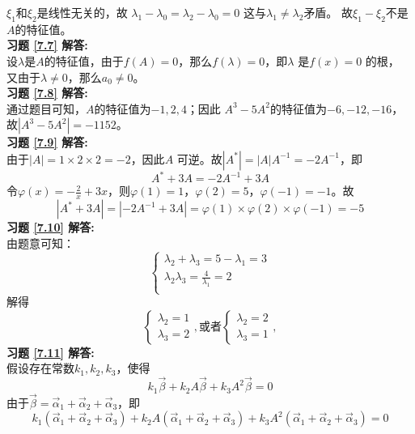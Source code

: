 \documentclass[a4paper]{book}
\begin{document}
$\xi_1$和$\xi_2$是线性无关的，故
$\lambda_1-\lambda_0=\lambda_2-\lambda_0=0$
这与$\lambda_1\neq\lambda_2$矛盾。
故$\xi_1-\xi_2$不是$A$的特征值。\\
\textbf{习题 \ref{7.7} 解答:}\\
设$\lambda$是$A$的特征值，由于$f(A)=0$，那么$f(\lambda)=0$，即$\lambda$ 是$f(x)=0$ 的根，
 又由于$\lambda\neq0$，那么$a_0\neq0$。\\
\textbf{习题 \ref{7.8} 解答:}\\
通过题目可知，$A$的特征值为$-1,2,4$；因此
$A^3-5A^2$的特征值为$-6,-12,-16$，故$|A^3-5A^2|=-1152$。\\
\textbf{习题 \ref{7.9} 解答:}\\
由于$|A|=1\times2\times2=-2$，因此$A$ 可逆。故$|A^*|=|A|A^{-1}=-2A^{-1}$，即
\begin{equation*}
  A^*+3A=-2A^{-1}+3A
\end{equation*}
令$\varphi(x)=-\frac{2}{x}+3x$，则$\varphi(1)=1$，$\varphi(2)=5$，$\varphi(-1)=-1$。故
\begin{equation*}
  |A^*+3A|=|-2A^{-1}+3A|=\varphi(1)\times\varphi(2)\times\varphi(-1)=-5
\end{equation*}
\textbf{习题 \ref{7.10} 解答:}\\
由题意可知：
\begin{equation*}
  \begin{cases}
  \lambda_2+\lambda_3=5-\lambda_1=3\\
  \lambda_2\lambda_3=\frac{4}{\lambda_1}=2\\
  \end{cases}
\end{equation*}
解得
\begin{equation*}
  \begin{cases}
  \lambda_2=1\\
  \lambda_3=2
  \end{cases},
  \text{或者}
    \begin{cases}
  \lambda_2=2\\
  \lambda_3=1
  \end{cases},
\end{equation*}
\textbf{习题 \ref{7.11} 解答:}\\
假设存在常数$k_1,k_2,k_3$，使得
\begin{equation*}
  k_1\vec{\beta}+k_2A\vec{\beta}+k_3A^2\vec{\beta}=0
\end{equation*}
由于$\vec{\beta}=\vec{\alpha}_1+\vec{\alpha}_2+\vec{\alpha}_3$，即
\begin{equation*}
  k_1(\vec{\alpha}_1+\vec{\alpha}_2+\vec{\alpha}_3)+
  k_2A(\vec{\alpha}_1+\vec{\alpha}_2+\vec{\alpha}_3)+
  k_3A^2(\vec{\alpha}_1+\vec{\alpha}_2+\vec{\alpha}_3)=0
\end{equation*}
\end{document}
